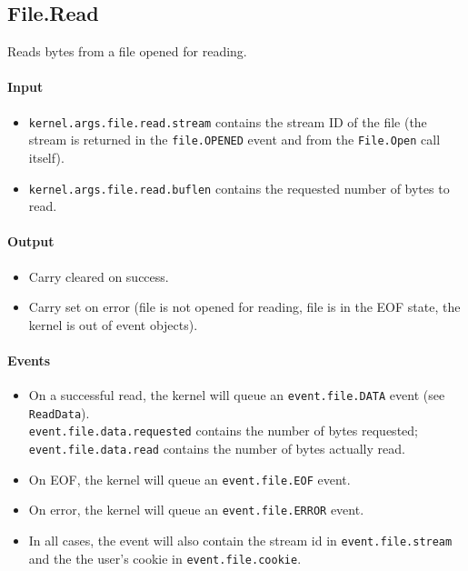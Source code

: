 \subsection*{File.Read}
Reads bytes from a file opened for reading.

\paragraph{Input}
\begin{itemize}
\item \verb+kernel.args.file.read.stream+ contains the stream ID of the file (the stream is returned in the \verb+file.OPENED+ event and from the \verb+File.Open+ call itself).
\item \verb+kernel.args.file.read.buflen+ contains the requested number of bytes to read.
\end{itemize}

\paragraph{Output}
\begin{itemize}
\item Carry cleared on success.
\item Carry set on error (file is not opened for reading, file is in the EOF state, the kernel is out of event objects).
\end{itemize}

\paragraph{Events}
\begin{itemize}
\item On a successful read, the kernel will queue an \verb+event.file.DATA+ event (see \verb+ReadData+). \\ \verb+event.file.data.requested+ contains the number of bytes requested;  \verb+event.file.data.read+ contains the number of bytes actually read.
\item On EOF, the kernel will queue an \verb+event.file.EOF+ event.
\item On error, the kernel will queue an \verb+event.file.ERROR+ event.
\item In all cases, the event will also contain the stream id in \verb+event.file.stream+ and the the user's cookie in \verb+event.file.cookie+.
\end{itemize}

